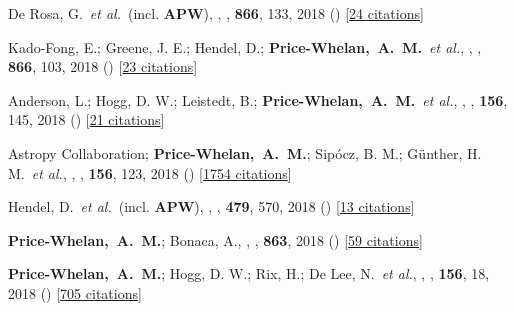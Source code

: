 \item[{\color{deemph}\scriptsize46}]De Rosa, G.~\textit{et al.}~(incl. \textbf{APW}), , \apj, \textbf{866}, 133, 2018 () [\href{http://adsabs.harvard.edu/abs/2018ApJ...866..133D}{24 citations}]

\item[{\color{deemph}\scriptsize45}]Kado-Fong, E.; Greene, J. E.; Hendel, D.; \textbf{Price-Whelan,~A.~M.}~\textit{et al.}, , \apj, \textbf{866}, 103, 2018 () [\href{http://adsabs.harvard.edu/abs/2018ApJ...866..103K}{23 citations}]

\item[{\color{deemph}\scriptsize44}]Anderson, L.; Hogg, D. W.; Leistedt, B.; \textbf{Price-Whelan,~A.~M.}~\textit{et al.}, , \aj, \textbf{156}, 145, 2018 () [\href{http://adsabs.harvard.edu/abs/2018AJ....156..145A}{21 citations}]

\item[{\color{deemph}\scriptsize43}]Astropy Collaboration; \textbf{Price-Whelan,~A.~M.}; Sip{\'{o}}cz, B. M.; G{\"u}nther, H. M.~\textit{et al.}, , \aj, \textbf{156}, 123, 2018 () [\href{http://adsabs.harvard.edu/abs/2018AJ....156..123A}{1754 citations}]

\item[{\color{deemph}\scriptsize42}]Hendel, D.~\textit{et al.}~(incl. \textbf{APW}), , \mnras, \textbf{479}, 570, 2018 () [\href{http://adsabs.harvard.edu/abs/2018MNRAS.479..570H}{13 citations}]

\item[{\color{deemph}\scriptsize41}]\textbf{Price-Whelan,~A.~M.}; Bonaca, A., , \apj, \textbf{863}, 2018 () [\href{http://adsabs.harvard.edu/abs/2018ApJ...863L..20P}{59 citations}]

\item[{\color{deemph}\scriptsize40}]\textbf{Price-Whelan,~A.~M.}; Hogg, D. W.; Rix, H.; De Lee, N.~\textit{et al.}, , \aj, \textbf{156}, 18, 2018 () [\href{http://adsabs.harvard.edu/abs/2018AJ....156...18P}{705 citations}]

